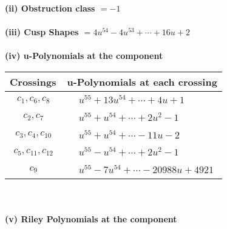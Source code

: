 \documentclass[1p]{elsarticle_modified}
\theoremstyle{definition}
\begin{document}
\flushleft \textbf{(ii) Obstruction class $= -1$}\\~\\
\flushleft \textbf{(iii) Cusp Shapes $= 4 u^{54}-4 u^{53}+\cdots+16 u+2$}\\~\\
\newpage\renewcommand{\arraystretch}{1}
\flushleft \textbf{(iv) u-Polynomials at the component}\newline \\
\begin{tabular}{m{50pt}|m{274pt}}
Crossings & \hspace{64pt}u-Polynomials at each crossing \\
\hline $$\begin{aligned}c_{1},c_{6},c_{8}\end{aligned}$$&$\begin{aligned}
&u^{55}+13 u^{54}+\cdots+4 u+1
\end{aligned}$\\
\hline $$\begin{aligned}c_{2},c_{7}\end{aligned}$$&$\begin{aligned}
&u^{55}+u^{54}+\cdots+2 u^2-1
\end{aligned}$\\
\hline $$\begin{aligned}c_{3},c_{4},c_{10}\end{aligned}$$&$\begin{aligned}
&u^{55}+u^{54}+\cdots-11 u-2
\end{aligned}$\\
\hline $$\begin{aligned}c_{5},c_{11},c_{12}\end{aligned}$$&$\begin{aligned}
&u^{55}- u^{54}+\cdots+2 u^2-1
\end{aligned}$\\
\hline $$\begin{aligned}c_{9}\end{aligned}$$&$\begin{aligned}
&u^{55}-7 u^{54}+\cdots-20988 u+4921
\end{aligned}$\\
\hline
\end{tabular}\\~\\
\newpage\renewcommand{\arraystretch}{1}
\flushleft \textbf{(v) Riley Polynomials at the component}\newline \\
\end{document}
